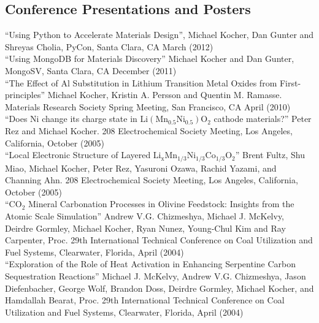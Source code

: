 \documentclass[margin,line]{resume}
\begin{document}
\begin{resume}
		\section{\mysidestyle Conference Presentations and
                  Posters}
                ``Using Python to Accelerate Materials Design'',
                Michael Kocher, Dan Gunter and Shreyas Cholia, PyCon,
                Santa Clara, CA March (2012)\vspace{2mm}\\
		``Using MongoDB for Materials Discovery'' Michael
                Kocher and Dan Gunter, MongoSV, Santa Clara, CA December (2011)\vspace{2mm}\\
                ``The Effect of Al Substitution in Lithium Transition Metal Oxides from First-principles'' Michael Kocher, Kristin A. Persson and Quentin M. Ramasse. Materials Research Society Spring Meeting, San Francisco, CA April (2010)\vspace{2mm}\\
		``Does Ni change its charge state in $\mathrm{Li(Mn_{0.5}Ni_{0.5})O_2}$ cathode materials?'' Peter Rez and Michael Kocher. 208 Electrochemical Society Meeting, Los Angeles, California, October (2005) \vspace{2mm}\\
		``Local Electronic Structure of Layered $\mathrm{Li_{x}Mn_{1/3}Ni_{1/3}Co_{1/3}O_{2}}$'' Brent Fultz, Shu Miao, Michael Kocher, Peter Rez, Yasuroni Ozawa, Rachid Yazami, and Channing Ahn. 208 Electrochemical Society Meeting, Los Angeles, California, October (2005) \vspace{2mm}\\

		``$\mathrm{CO_2}$ Mineral Carbonation Processes in
                  Olivine Feedstock: Insights from the Atomic Scale
                  Simulation'' Andrew V.G. Chizmeshya, Michael J.
                McKelvy, Deirdre Gormley, Michael Kocher, Ryan Nunez,
                Young-Chul Kim and Ray Carpenter, Proc. 29th
                International Technical Conference on Coal Utilization
                and Fuel Systems, Clearwater, Florida, April (2004)
                \vspace{2mm}\\
		``Exploration of the Role of Heat Activation in Enhancing Serpentine Carbon Sequestration Reactions'' Michael J. McKelvy, Andrew V.G. Chizmeshya, Jason Diefenbacher, George Wolf, Brandon Doss, Deirdre Gormley, Michael Kocher, and Hamdallah Bearat, Proc. 29th International Technical Conference on Coal Utilization and Fuel Systems, Clearwater, Florida, April (2004)\vspace{2mm}\\

\end{resume}
\end{document}
